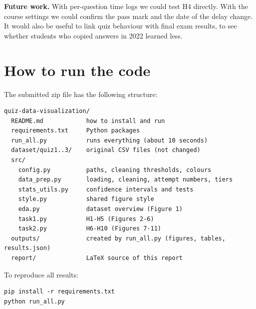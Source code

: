 \textbf{Future work.} With per-question time logs we could test H4 directly.
With the course settings we could confirm the pass mark and the date of the
delay change. It would also be useful to link quiz behaviour with final exam
results, to see whether students who copied answers in 2022 learned less.




\appendix
\section{How to run the code}
\label{app:code}

The submitted zip file has the following structure:

\begin{verbatim}
quiz-data-visualization/
  README.md            how to install and run
  requirements.txt     Python packages
  run_all.py           runs everything (about 10 seconds)
  dataset/quiz1..3/    original CSV files (not changed)
  src/
    config.py          paths, cleaning thresholds, colours
    data_prep.py       loading, cleaning, attempt numbers, tiers
    stats_utils.py     confidence intervals and tests
    style.py           shared figure style
    eda.py             dataset overview (Figure 1)
    task1.py           H1-H5 (Figures 2-6)
    task2.py           H6-H10 (Figures 7-11)
  outputs/             created by run_all.py (figures, tables, results.json)
  report/              LaTeX source of this report
\end{verbatim}

To reproduce all results:
\begin{verbatim}
pip install -r requirements.txt
python run_all.py
\end{verbatim}
